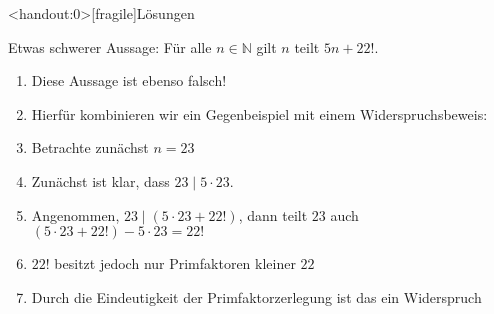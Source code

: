 {
\begin{frame}<handout:0>[fragile]{Lösungen}   
    \begin{block}{Etwas schwerer}
        Aussage: Für alle $n \in \mathbb{N}$ gilt $n$ teilt $5n + 22!$.
        \begin{enumerate}
            \item<2-> Diese Aussage ist ebenso falsch!
            \item<3-> Hierfür kombinieren wir ein Gegenbeispiel mit einem Widerspruchsbeweis:
            \item<4-> Betrachte zunächst $n = 23$
            \item<5-> Zunächst ist klar, dass $23 \mid 5\cdot23$.
            \item<6-> Angenommen, $23 \mid (5\cdot23 + 22!)$, dann teilt $23$ auch $(5\cdot23+22!)-5\cdot23 = 22!$
            \item<7-> $22!$ besitzt jedoch nur Primfaktoren kleiner $22$
            \item<8-> Durch die Eindeutigkeit der Primfaktorzerlegung ist das ein Widerspruch
        \end{enumerate}
    \end{block}
\end{frame}
}